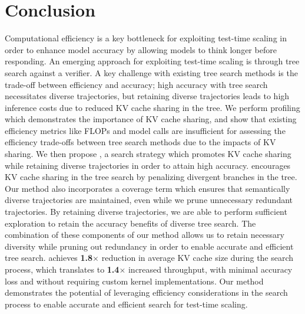 \section{Conclusion}

Computational efficiency is a key bottleneck for exploiting test-time scaling in order to enhance model accuracy by allowing models to think longer before responding.
An emerging approach for exploiting test-time scaling is through tree search against a verifier.
A key challenge with existing tree search methods is the trade-off between efficiency and accuracy; high accuracy with tree search necessitates diverse trajectories, but retaining diverse trajectories leads to high inference costs due to reduced KV cache sharing in the tree.
We perform profiling which demonstrates the importance of KV cache sharing, and show that existing efficiency metrics like FLOPs and model calls are insufficient for assessing the efficiency trade-offs between tree search methods due to the impacts of KV sharing.
We then propose \ours, a search strategy which promotes KV cache sharing while retaining diverse trajectories in order to attain high accuracy.
\ours encourages KV cache sharing in the tree search by penalizing divergent branches in the tree.
Our method also incorporates a coverage term which ensures that semantically diverse trajectories are maintained, even while we prune unnecessary redundant trajectories.
By retaining diverse trajectories, we are able to perform sufficient exploration to retain the accuracy benefits of diverse tree search.
The combination of these components of our method allows us to retain necessary diversity while pruning out redundancy in order to enable accurate and efficient tree search.
\ours achieves \textbf{1.8}$\times$ reduction in average KV cache size during the search process, which translates to \textbf{1.4}$\times$ increased throughput, with minimal accuracy loss and without requiring custom kernel implementations.
Our method demonstrates the potential of leveraging efficiency considerations in the search process to enable accurate and efficient search for test-time scaling.
